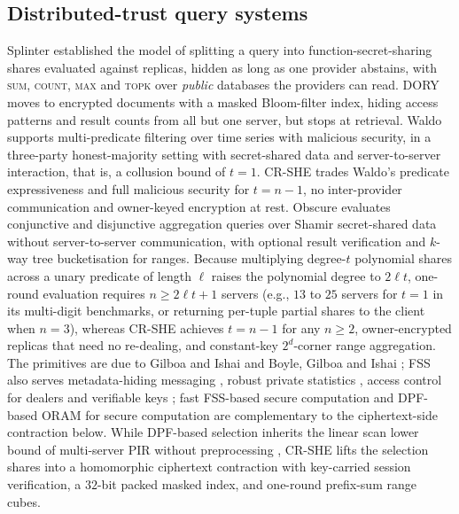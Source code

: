 \documentclass[a4paper,fleqn]{cas-sc}
\begin{document}
\subsection{Distributed-trust query systems}
Splinter \citep{splinter} established the model of splitting a query into
function-secret-sharing shares evaluated against replicas, hidden as long as
one provider abstains, with \textsc{sum}, \textsc{count}, \textsc{max} and
\textsc{topk} over \emph{public} databases the providers can read. DORY
\citep{dory} moves to encrypted documents with a masked Bloom-filter index,
hiding access patterns and result counts from all but one server, but stops at
retrieval. Waldo \citep{waldo} supports multi-predicate filtering over
time series with malicious security, in a three-party honest-majority setting
with secret-shared data and server-to-server interaction, that is, a
collusion bound of $t=1$. CR-SHE trades Waldo's predicate expressiveness and
full malicious security for $t=n-1$, no inter-provider communication and
owner-keyed encryption at rest. Obscure \citep{gupta2019obscure,gupta2020obscure} evaluates conjunctive and
disjunctive aggregation queries over Shamir secret-shared data without
server-to-server communication, with optional result verification and
$k$-way tree bucketisation for ranges. Because multiplying degree-$t$
polynomial shares across a unary predicate of length $\ell$ raises the
polynomial degree to $2\ell t$, one-round evaluation requires $n \ge 2\ell t + 1$
servers (e.g., $13$ to $25$ servers for $t=1$ in its multi-digit benchmarks,
or returning per-tuple partial shares to the client when $n=3$), whereas
CR-SHE achieves $t=n-1$ for any $n\ge 2$, owner-encrypted replicas that need no
re-dealing, and constant-key $2^d$-corner range aggregation. The primitives are due to Gilboa and Ishai
\citep{gilboa2014distributed} and Boyle, Gilboa and Ishai
\citep{boyle2015function,boyle2016function}; FSS also serves metadata-hiding
messaging \citep{express}, robust private statistics
\citep{corrigan2017prio,boneh2021lightweight}, access control for dealers
\citep{pacl} and verifiable keys \citep{decastro2022lightweight}; fast
FSS-based secure computation \citep{storrier2023grotto} and DPF-based ORAM for
secure computation \citep{doerner2017scaling} are complementary to the
ciphertext-side contraction below. While DPF-based selection inherits the linear scan lower bound of
multi-server PIR without preprocessing \citep{chor1998private,beimel2000reducing},
CR-SHE lifts the selection shares into a homomorphic ciphertext contraction
with key-carried session verification, a $32$-bit packed masked index, and
one-round prefix-sum range cubes.
\end{document}
